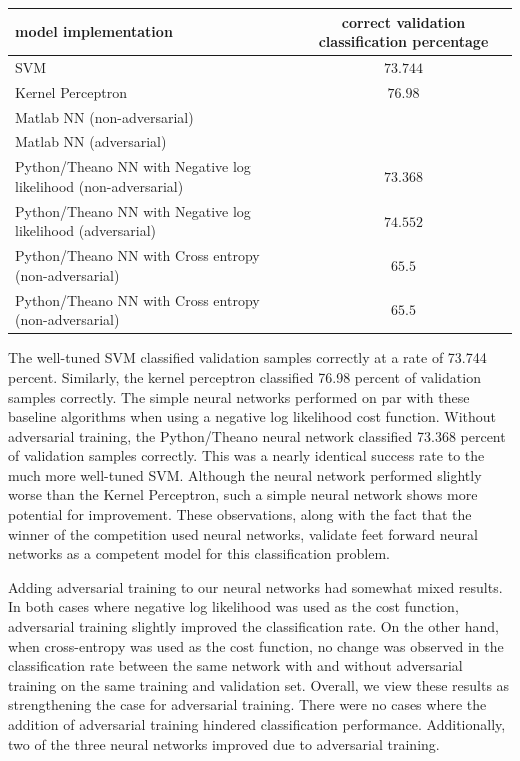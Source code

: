 \documentclass          {article} %
\begin{document}
\begin{center}
	\begin{tabular}{|l|c|}
	  \hline
	  model implementation&correct validation classification percentage \\
		\hline
		SVM&$73.744$ \\
		\hline
		Kernel Perceptron&$76.98$ \\
		\hline
		Matlab NN (non-adversarial)&  \\
		\hline
		Matlab NN (adversarial)&  \\
	  \hline
	  Python/Theano NN with Negative log likelihood (non-adversarial)&$73.368$ \\
		\hline
		Python/Theano NN with Negative log likelihood (adversarial)&$74.552$ \\
	  \hline
	  Python/Theano NN with Cross entropy (non-adversarial)&$65.5$ \\
		\hline
	  Python/Theano NN with Cross entropy (non-adversarial)&$65.5$ \\
	  \hline
	\end{tabular}
\end{center}
 
The well-tuned SVM classified validation samples correctly at a rate of 73.744 percent. Similarly, the kernel perceptron classified 76.98 percent of validation samples correctly. The simple neural networks performed on par with these baseline algorithms when using a negative log likelihood cost function. Without adversarial training, the Python/Theano neural network classified 73.368 percent of validation samples correctly. This was a nearly identical success rate to the much more well-tuned SVM. Although the neural network performed slightly worse than the Kernel Perceptron, such a simple neural network shows more potential for improvement. These observations, along with the fact that the winner of the competition used neural networks, validate feet forward neural networks as a competent model for this classification problem.

Adding adversarial training to our neural networks had somewhat mixed results. In both cases where negative log likelihood was used as the cost function, adversarial training slightly improved the classification rate. On the other hand, when cross-entropy was used as the cost function, no change was observed in the classification rate between the same network with and without adversarial training on the same training and validation set. Overall, we view these results as strengthening the case for adversarial training. There were no cases where the addition of adversarial training hindered classification performance. Additionally, two of the three neural networks improved due to adversarial training.
\end{document}

